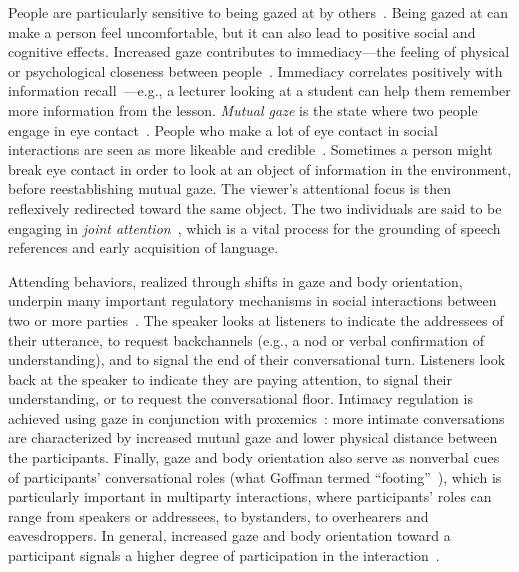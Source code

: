 People are particularly sensitive to being gazed at by others~\citep{argyle1976gaze}. Being gazed at can make a person feel uncomfortable, but it can also lead to positive social and cognitive effects. Increased gaze contributes to immediacy---the feeling of physical or psychological closeness between people~\citep{mehrabian1966immediacy}. Immediacy correlates positively with information recall~\citep{otteson1980effect,sherwood1987facilitative,fullwood2006effect,kelley1988effects}---e.g., a lecturer looking at a student can help them remember more information from the lesson.
\emph{Mutual gaze} is the state where two people engage in eye contact~\citep{argyle1976gaze}. People who make a lot of eye contact in social interactions are seen as more likeable and credible~\citep{beebe1976effects,argyle1976gaze}. Sometimes a person might break eye contact in order to look at an object of information in the environment, before reestablishing mutual gaze. The viewer's attentional focus is then reflexively redirected toward the same object. The two individuals are said to be engaging in \emph{joint attention}~\citep{moore2014joint}, which is a vital process for the grounding of speech references and early acquisition of language.

Attending behaviors, realized through shifts in gaze and body orientation, underpin many important regulatory mechanisms in social interactions between two or more parties~\citep{kendon1967some,heylen2006head}. The speaker looks at listeners to indicate the addressees of their utterance, to request backchannels (e.g., a nod or verbal confirmation of understanding), and to signal the end of their conversational turn. Listeners look back at the speaker to indicate they are paying attention, to signal their understanding, or to request the conversational floor. Intimacy regulation is achieved using gaze in conjunction with proxemics~\citep{argyle1965eyecontact}: more intimate conversations are characterized by increased mutual gaze and lower physical distance between the participants. Finally, gaze and body orientation also serve as nonverbal cues of participants' conversational roles (what Goffman termed ``footing''~\citep{goffman1979footing}), which is particularly important in multiparty interactions, where participants' roles can range from speakers or addressees, to bystanders, to overhearers and eavesdroppers. In general, increased gaze and body orientation toward a participant signals a higher degree of participation in the interaction~\citep{mutlu2012conversational}.

